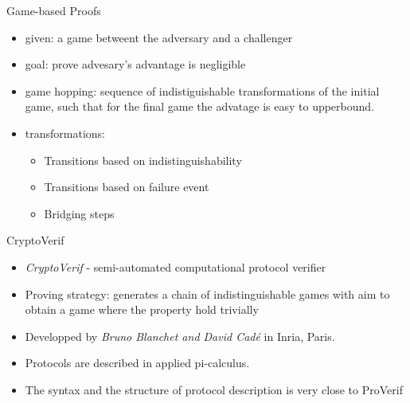 \documentclass{beamer}
\begin{document}

\begin{frame}{Game-based Proofs}
  \begin{itemize}
    \item given: a game betweent the adversary and a challenger
    \item goal: prove advesary's advantage is negligible
    \item game hopping: sequence of indistiguishable transformations of the initial game, such that for the final game the advatage is easy to upperbound.
    \item transformations:
    \begin{itemize}
      \item Transitions based on indistinguishability
      \item Transitions based on failure event
      \item Bridging steps
    \end{itemize}
  \end{itemize}
\end{frame}


\begin{frame}{CryptoVerif}
\begin{itemize}
    \item \textit{CryptoVerif} - semi-automated computational protocol verifier
    \item Proving strategy: generates a chain of indistinguishable games with aim to obtain a game where the property hold trivially
    \item Developped by \textit{Bruno Blanchet and David Cadé} in Inria, Paris.
    \item Protocols are described in applied pi-calculus.
    \item The syntax and the structure of protocol description is very close to ProVerif
\end{itemize}
\end{frame}

\end{document}
